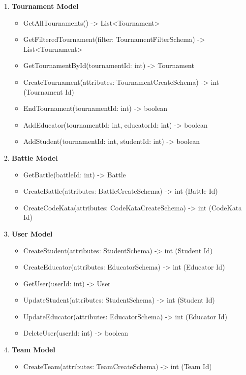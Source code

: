 \begin{enumerate}
    \item \textbf{Tournament Model}
    \begin{itemize}
        \item GetAllTournaments() -> List<Tournament> 
        \item GetFilteredTournament(filter: TournamentFilterSchema) -> List<Tournament>\\
        \item GetTournamentById(tournamentId: int) -> Tournament
        \item CreateTournament(attributes: TournamentCreateSchema) -> int (Tournament Id)
        \item EndTournament(tournamentId: int) -> boolean
        \item AddEducator(tournamentId: int, educatorId: int) -> boolean
        \item AddStudent(tournamentId: int, studentId: int) -> boolean
    \end{itemize}  
    \item \textbf{Battle Model}
    \begin{itemize}
        \item GetBattle(battleId: int) -> Battle
        \item CreateBattle(attributes: BattleCreateSchema) -> int (Battle Id)
        \item CreateCodeKata(attributes: CodeKataCreateSchema) -> int (CodeKata Id)
    \end{itemize}
    \item \textbf{User Model}
    \begin{itemize}
        \item CreateStudent(attributes: StudentSchema) -> int (Student Id)
        \item CreateEducator(attributes: EducatorSchema) -> int (Educator Id)
        \item GetUser(userId: int) -> User
        \item UpdateStudent(attributes: StudentSchema) -> int (Student Id)
        \item UpdateEducator(attributes: EducatorSchema) -> int (Educator Id)
        \item DeleteUser(userId: int) -> boolean
    \end{itemize}
    \item \textbf{Team Model}
    \begin{itemize}
        \item CreateTeam(attributes: TeamCreateSchema) -> int (Team Id)

\end{itemize}
\end{enumerate}
